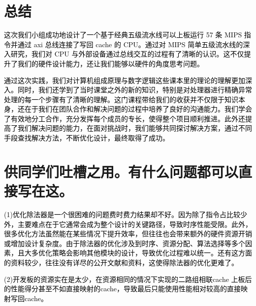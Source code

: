 \newpage
\section{总结}
\textcolor{black}{这次我们小组成功地设计了一个基于经典五级流水线可以上板运行 57 条 MIPS 指令并通过 axi 总线连接了写回 cache 的 CPU。通过对 MIPS 简单五级流水线的深入研究，我们对 CPU 与外部设备通过总线交互的过程有了清晰的认识。这不仅提升了我们的硬件设计能力，还让我们能够以硬件的角度思考问题。}

\textcolor{black}{通过这次实践，我们对计算机组成原理与数字逻辑这些课本里的理论的理解更加深入。同时，我们还学到了当时课堂之外的新的知识，特别是对处理器进行精确异常处理的每一个步骤有了清晰的理解。这门课程带给我们的收获并不仅限于知识本身，还在于我们在团队合作和解决问题的过程中培养了良好的沟通能力。我们学会了有效地分工合作，充分发挥每个成员的专长，使得整个项目顺利推进。此外还提高了我们解决问题的能力，在面对挑战时，我们能够共同探讨解决方案，通过不同手段查找解决方法，不断优化设计，最终取得了成功。}

\section{供同学们吐槽之用。有什么问题都可以直接写在这。}
\textcolor{black}{(1)优化除法器是一个很困难的问题费时费力结果却不好。因为除了指令占比较少外，主要难点在于它通常会成为整个设计的关键路径，导致时序性能受限。此外，很多优化方法虽然能在某些情况下提升效率，但往往也会带来额外的硬件资源开销或增加设计复杂度。由于除法器的优化涉及到时序、资源分配、算法选择等多个因素，且大多优化策略会影响其他模块的设计，导致优化过程难以统一。还有这方面的资料较少，往往没有详尽的公开文献和资料，这使得除法器的优化更难了。}

\textcolor{black}{(2)开发板的资源实在是太少，在资源相同的情况下实现的二路组相联cache 上板后的性能得分甚至不如直接映射的cache，导致最后只能使用性能相对较高的直接映射写回cache。}